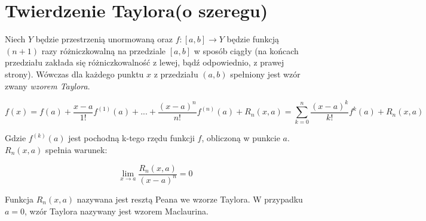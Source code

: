 \documentclass[12pt,a4paper]{article}
\begin{document}
\section{Twierdzenie Taylora(o szeregu)}

Niech $Y$ będzie przestrzenią unormowaną oraz $f:[a, b] \rightarrow Y$ będzie funkcją $(n + 1)$ razy różniczkowalną na przedziale $[a, b]$ w sposób ciągły (na końcach przedziału zakłada się różniczkowalność z lewej, bądź odpowiednio, z prawej strony). Wówczas dla każdego punktu $x$ z przedziału $(a, b)$ spełniony jest wzór zwany \textit{wzorem Taylora}.

$$f(x) = f(a) + \frac{x-a}{1!}f^{(1)}(a) + ... + \frac{(x-a)^n}{n!}f^{(n)}(a) + R_n(x, a) = \sum_{k=0}^{n} {\frac{(x - a)^k}{k!}f^{k}(a)} + R_n(x, a)$$

Gdzie $f^{(k)}(a)$ jest pochodną k-tego rzędu funkcji $f$, obliczoną w punkcie $a$. $R_n(x, a)$ spełnia warunek:

$$\lim_{x\to a}{\frac{R_n(x, a)}{(x-a)^n}} = 0$$

Funkcja $R_n(x, a)$ nazywana jest resztą Peana we wzorze Taylora. W przypadku $a = 0$, wzór Taylora nazywany jest wzorem Maclaurina.
\end{document}
